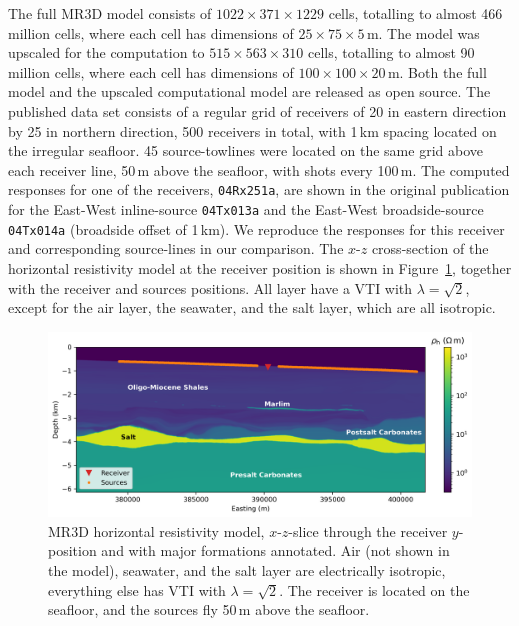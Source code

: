 \documentclass[extra, camera,%
]{gji}
\newlength{\fwidth}
\begin{document}
The full MR3D model consists of $1022\times371\times1229$ cells, totalling to almost 466 million cells, where each cell has dimensions of $25\times75\times5$\,m. The model was upscaled for the computation to $515\times563\times310$ cells, totalling to almost 90 million cells, where each cell has dimensions of $100\times100\times20$\,m. Both the full model and the upscaled computational model are released as open source. The published data set consists of a regular grid of receivers of 20 in eastern direction by 25 in northern direction, 500 receivers in total, with 1\,km spacing located on the irregular seafloor. 45 source-towlines were located on the same grid above each receiver line, 50\,m above the seafloor, with shots every 100\,m. The computed responses for one of the receivers, \texttt{04Rx251a}, are shown in the original publication for the East-West inline-source \texttt{04Tx013a} and the East-West broadside-source \texttt{04Tx014a} (broadside offset of 1\,km). We reproduce the responses for this receiver and corresponding source-lines in our comparison. The $x$-$z$ cross-section of the horizontal resistivity model at the receiver position is shown in Figure~\ref{fig:model-marlim}, together with the receiver and sources positions. All layer have a VTI with $\lambda=\sqrt{2}$, except for the air layer, the seawater, and the salt layer, which are all isotropic.

%
\begin{figure}
  \centering
  \includegraphics[width=.9\fwidth]{figures/model-marlim.png}
  \caption{MR3D horizontal resistivity model, $x$-$z$-slice through the receiver $y$-position and with major formations annotated. Air (not shown in the model), seawater, and the salt layer are electrically isotropic, everything else has VTI with $\lambda=\sqrt{2}$. The receiver is located on the seafloor, and the sources fly 50\,m above the seafloor.}
  \label{fig:model-marlim}
\end{figure}
%
\end{document}
